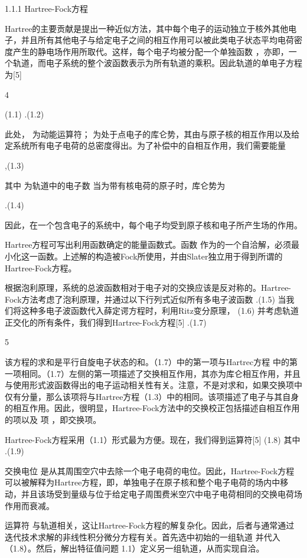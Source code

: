 1.1.1 Hartree-Fock方程

Hartree的主要贡献是提出一种近似方法，其中每个电子的运动独立于核外其他电子，并且所有其他电子与给定电子之间的相互作用可以被此类电子状态平均电荷密度产生的静电场作用所取代。这样，每个电子均被分配一个单独函数 ，亦即，一个轨道，而电子系统的整个波函数表示为所有轨道的乘积。因此轨道的单电子方程为[5]




4




(1.1)
.(1.2)

此处，  为动能运算符；  为处于点电子的库仑势，其由与原子核的相互作用以及给定系统所有电子电荷的总密度得出。为了补偿中的自相互作用，我们需要能量

,(1.3)

其中  为轨道中的电子数
当为带有核电荷的原子时，库仑势为

.(1.4)

因此，在一个包含电子的系统中，每个电子均受到原子核和电子所产生场的作用。

Hartree方程可写出利用函数确定的能量函数式。函数 作为的一个自洽解，必须最小化这一函数。上述解的构造被Fock所使用，并由Slater独立用于得到所谓的Hartree-Fock方程。

根据泡利原理，系统的总波函数相对于电子对的交换应该是反对称的。Hartree-Fock方法考虑了泡利原理，并通过以下行列式近似所有多电子波函数
.(1.5)
当我们将这种多电子波函数代入薛定谔方程时，利用Ritz变分原理，
(1.6)
并考虑轨道正交化的所有条件，我们得到Hartree-Fock方程[5]
.(1.7)



5


该方程的求和是平行自旋电子状态的和。（1.7）中的第一项与Hartrec方程 中的第一项相同。（1.7）左侧的第一项描述了交换相互作用，其亦为库仑相互作用，并且与使用形式波函数得出的电子运动相关性有关。注意，不是对求和，如果交换项中仅有分量，那么该项将与Hartree方程（1.3）中的相同。该项描述了电子与其自身的相互作用。因此，很明显，Hartree-Fock方法中的交换校正包括描述自相互作用的项以及 项 ，即交换项。

Hartree-Fock方程采用（1.1）形式最为方便。现在，我们得到运算符[5]
(1.8)
其中
.(1.9)

交换电位 是从其周围空穴中去除一个电子电荷的电位。因此，Hartree-Fock方程可以被解释为Hartree方程，即，单独电子在原子核和整个电子电荷的场内中移动，并且该场受到量级与位于给定电子周围费米空穴中电子电荷相同的交换电荷场作用而衰减。

运算符 与轨道相关，这让Hartree-Fock方程的解复杂化。因此，后者与通常通过迭代技术求解的非线性积分微分方程有关。首先选中初始的一组轨道 并代入（1.8）。然后，解出特征值问题  1.1）定义另一组轨道，从而实现自洽。

